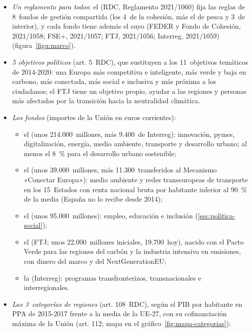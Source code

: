 \documentclass[11pt]{article}
\begin{document}
\begin{itemize}
\item \emph{Un reglamento para todos}: el  (RDC, Reglamento 2021/1060) fija las reglas de 8~fondos de gestión compartida (los 4~de la cohesión, más el de pesca y 3~de interior), y cada fondo tiene además el suyo (FEDER y Fondo de Cohesión, 2021/1058; FSE+, 2021/1057; FTJ, 2021/1056; Interreg, 2021/1059)\nocite{UE2021RDC} (figura~\ref{figu:marco}).
\item \emph{5 objetivos políticos} (art. 5~RDC), que sustituyen a los 11~objetivos temáticos de 2014-2020: una Europa más competitiva e inteligente, más verde y baja en carbono, más conectada, más social e inclusiva y más próxima a los ciudadanos; el FTJ tiene un objetivo propio, ayudar a las regiones y personas más afectadas por la transición hacia la neutralidad climática\nocite{UE2021RDC}.
\item \emph{Los fondos} (importes de la Unión en euros corrientes)\nocite{CE2026Cohesiondata,PE2026FichaCohesion}:
  \begin{itemize}
  \item el  (unos 214.000~millones, más 9.400~de Interreg): innovación, pymes, digitalización, energía, medio ambiente, transporte y desarrollo urbano; al menos el 8~\% para el desarrollo urbano sostenible\nocite{UE2021RDC};
  \item el  (unos 39.000~millones, más 11.300~transferidos al Mecanismo «Conectar Europa»): medio ambiente y redes transeuropeas de transporte en los 15~Estados con renta nacional bruta por habitante inferior al 90~\% de la media (España no lo recibe desde 2014)\nocite{UE2021Categorias};
  \item el  (unos 95.000~millones): empleo, educación e inclusión\nocite{UE2021FSE} (\ref{sec:politica-social});
  \item el  (FTJ; unos 22.000~millones iniciales, 19.700~hoy), nacido con el Pacto Verde para las regiones del carbón y la industria intensiva en emisiones, con dinero del marco y del NextGenerationEU\nocite{CE2026Cohesiondata};
  \item la  (Interreg): programas transfronterizos, transnacionales e interregionales.
  \end{itemize}
\item \emph{Las 3~categorías de regiones} (art. 108~RDC), según el PIB por habitante en PPA de 2015-2017 frente a la media de la UE-27, con su cofinanciación máxima de la Unión (art. 112; mapa en el gráfico~\ref{fig:mapa-categorias})\nocite{UE2021RDC}:

\end{itemize}
\end{document}
